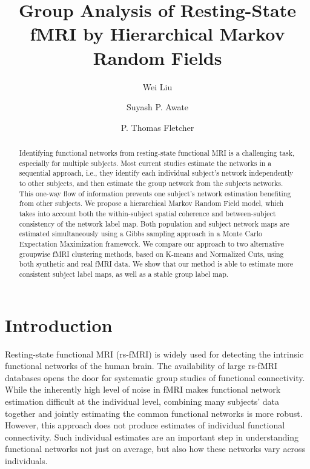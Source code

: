 \documentclass[runningheads,a4paper]{llncs}
\begin{document}
\mainmatter

\title{Group Analysis of Resting-State fMRI by Hierarchical Markov Random Fields}


\author{Wei Liu \and Suyash P. Awate\and P. Thomas Fletcher}





\maketitle

\begin{abstract}
Identifying functional networks from resting-state functional MRI is a
challenging task, especially for multiple subjects. Most current studies
estimate the networks in a sequential approach, i.e., they identify each
individual subject's network independently to other subjects, and then estimate
the group network from the subjects networks. This one-way flow of information
prevents one subject's network estimation benefiting from other subjects. We
propose a hierarchical Markov Random Field model, which takes into account both
the within-subject spatial coherence and between-subject consistency of the
network label map. Both population and subject network maps are estimated
simultaneously using a Gibbs sampling approach in a Monte Carlo Expectation
Maximization framework. We compare our approach to two alternative groupwise
fMRI clustering methods, based on K-means and Normalized Cuts, using both
synthetic and real fMRI data. We show that our method is able to estimate more
consistent subject label maps, as well as a stable group label map.
\end{abstract}


\section{Introduction}
Resting-state functional MRI (rs-fMRI) is widely used for detecting the
intrinsic functional networks of the human brain. The availability of large
rs-fMRI databases opens the door for systematic group studies of functional
connectivity. While the inherently high level of noise in fMRI makes functional
network estimation difficult at the individual level, combining many subjects'
data together and jointly estimating the common functional networks is more
robust. However, this approach does not produce estimates of individual
functional connectivity. Such individual estimates are an important step in
understanding functional networks not just on average, but also how these
networks vary across individuals.
\end{document}
